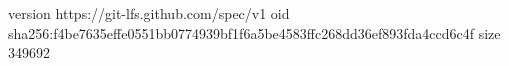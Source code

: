 version https://git-lfs.github.com/spec/v1
oid sha256:f4be7635effe0551bb0774939bf1f6a5be4583ffc268dd36ef893fda4ccd6c4f
size 349692
